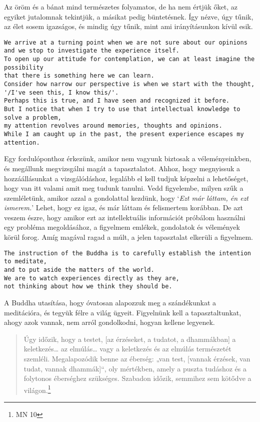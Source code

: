 Az öröm és a bánat mind természetes folyamatos, de ha nem értjük őket,
az egyiket jutalomnak tekintjük, a másikat pedig büntetésnek. Így nézve,
úgy tűnik, az élet sosem igazságos, és mindig úgy tűnik, mint ami
irányításunkon kívül esik.

\begin{verbatim}
We arrive at a turning point when we are not sure about our opinions and we stop to investigate the experience itself.
To open up our attitude for contemplation, we can at least imagine the possibility
that there is something here we can learn.
Consider how narrow our perspective is when we start with the thought, '/I've seen this, I know this/'.
Perhaps this is true, and I have seen and recognized it before.
But I notice that when I try to use that intellectual knowledge to solve a problem,
my attention revolves around memories, thoughts and opinions.
While I am caught up in the past, the present experience escapes my attention.
\end{verbatim}

Egy fordulóponthoz érkezünk, amikor nem vagyunk biztosak a
véleményeinkben, és megállunk megvizsgálni magát a tapasztalatot. Ahhoz,
hogy megnyissuk a hozzáállásunkat a vizsgálódáshoz, legalább el kell
tudjuk képzelni a lehetőséget, hogy van itt valami amit meg tudunk
tanulni. Vedd figyelembe, milyen szűk a szemléletünk, amikor azzal a
gondolattal kezdünk, hogy `\emph{Ezt már láttam, én ezt ismerem.}'
Lehet, hogy ez igaz, és már láttam és felismertem korábban. De azt
veszem észre, hogy amikor ezt az intellektuális információt próbálom
használni egy probléma megoldásához, a figyelmem emlékek, gondolatok és
vélemények körül forog. Amíg magával ragad a múlt, a jelen tapasztalat
elkerüli a figyelmem.

\begin{verbatim}
The instruction of the Buddha is to carefully establish the intention to meditate,
and to put aside the matters of the world.
We are to watch experiences directly as they are,
not thinking about how we think they should be.
\end{verbatim}

A Buddha utasítása, hogy óvatosan alapozzuk meg a szándékunkat a
meditációra, és tegyük félre a világ ügyeit. Figyelnünk kell a
tapasztaltunkat, ahogy azok vannak, nem arról gondolkodni, hogyan
kellene legyenek.

\begin{quote}
Úgy időzik, hogy a testet, {[}az érzéseket, a tudatot, a dhammákban{]} a
keletkezés\ldots{} az elmúlás\ldots{} vagy a keletkezés és az elmúlás
természetét szemléli. Megalapozódik benne az éberség: „van test,
{[}vannak érzések, van tudat, vannak dhammák{]}``, oly mértékben, amely
a puszta tudáshoz és a folytonos éberséghez szükséges. Szabadon időzik,
semmihez sem kötődve a világon.\footnote{MN 10}
\end{quote}

